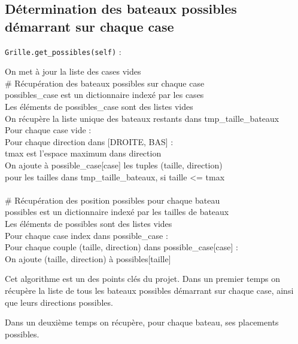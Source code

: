 \subsection{Détermination des bateaux possibles démarrant sur chaque case}\label{get_possibles}
\texttt{Grille.get\_possibles(self)} :
\begin{algo1}
On met à jour la liste des cases vides\\
\# Récupération des bateaux possibles sur chaque case\\
possibles\_case est un dictionnaire indexé par les cases\\
Les éléments de possibles\_case sont des listes vides\\
On récupère la liste unique des bateaux restants dans tmp\_taille\_bateaux\\
Pour chaque case vide :\\
Pour chaque direction dans [DROITE, BAS] :\\
tmax est l'espace maximum dans direction\\
On ajoute à possible\_case[case] les tuples (taille, direction)\\
pour les tailles dans tmp\_taille\_bateaux, si taille <= tmax\\
\ \\
\# Récupération des position possibles pour chaque bateau\\
possibles est un dictionnaire indexé par les tailles de bateaux\\
Les éléments de possibles sont des listes vides\\
Pour chaque case index dans possible\_case :\\
Pour chaque couple (taille, direction) dans possible\_case[case] :\\
On ajoute (taille, direction) à possibles[taille]\\ 
\end{algo1}

Cet algorithme est un des points clés du projet. Dans un premier temps on récupère la liste de tous les bateaux possibles démarrant sur chaque case, ainsi que leurs directions possibles.

Dans un deuxième temps on récupère, pour chaque bateau, ses placements possibles. 

\newpage

